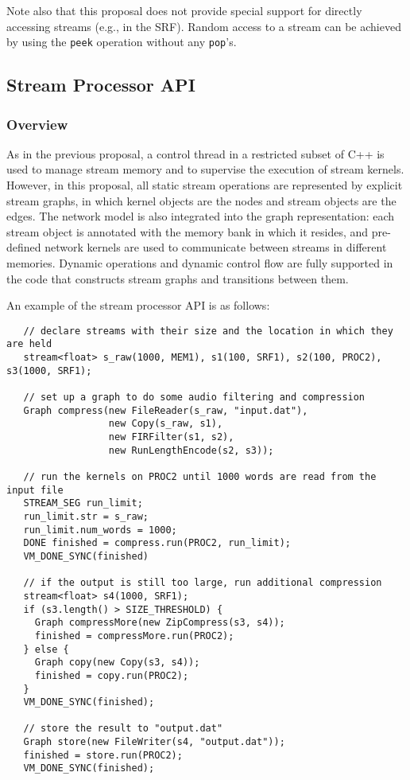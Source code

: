 Note also that this proposal does not provide special support for
directly accessing streams (e.g., in the SRF).  Random access to a
stream can be achieved by using the {\tt peek} operation without any
{\tt pop}'s.

\subsection{Stream Processor API}

\subsubsection{Overview}
\label{sec:streamover}

As in the previous proposal, a control thread in a restricted subset
of C++ is used to manage stream memory and to supervise the execution
of stream kernels.  However, in this proposal, all static stream
operations are represented by explicit stream graphs, in which kernel
objects are the nodes and stream objects are the edges.  The network
model is also integrated into the graph representation: each stream
object is annotated with the memory bank in which it resides, and
pre-defined network kernels are used to communicate between streams in
different memories.  Dynamic operations and dynamic control flow are
fully supported in the code that constructs stream graphs and
transitions between them.

An example of the stream processor API is as follows:
\begin{verbatim}
   // declare streams with their size and the location in which they are held
   stream<float> s_raw(1000, MEM1), s1(100, SRF1), s2(100, PROC2), s3(1000, SRF1);

   // set up a graph to do some audio filtering and compression
   Graph compress(new FileReader(s_raw, "input.dat"),
                  new Copy(s_raw, s1),
                  new FIRFilter(s1, s2),
                  new RunLengthEncode(s2, s3));

   // run the kernels on PROC2 until 1000 words are read from the input file
   STREAM_SEG run_limit;
   run_limit.str = s_raw;
   run_limit.num_words = 1000;
   DONE finished = compress.run(PROC2, run_limit);
   VM_DONE_SYNC(finished)

   // if the output is still too large, run additional compression
   stream<float> s4(1000, SRF1);
   if (s3.length() > SIZE_THRESHOLD) {
     Graph compressMore(new ZipCompress(s3, s4));
     finished = compressMore.run(PROC2);
   } else {
     Graph copy(new Copy(s3, s4));
     finished = copy.run(PROC2);
   }
   VM_DONE_SYNC(finished);

   // store the result to "output.dat"
   Graph store(new FileWriter(s4, "output.dat"));
   finished = store.run(PROC2);
   VM_DONE_SYNC(finished);
\end{verbatim}

